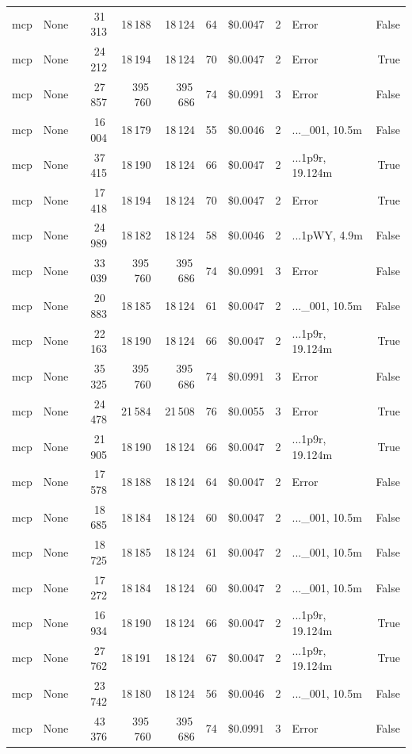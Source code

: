 \documentclass[a4paper,11pt]{article}
\begin{document}
\begin{table}[H]
{\begin{tabular}{l r r r r r r r l r}
mcp & None & 31\,313 & 18\,188 & 18\,124 & 64 & \$0.0047 & 2 & Error & False \\
mcp & None & 24\,212 & 18\,194 & 18\,124 & 70 & \$0.0047 & 2 & Error & True \\
mcp & None & 27\,857 & 395\,760 & 395\,686 & 74 & \$0.0991 & 3 & Error & False \\
mcp & None & 16\,004 & 18\,179 & 18\,124 & 55 & \$0.0046 & 2 & ...\_001, 10.5m & False \\
mcp & None & 37\,415 & 18\,190 & 18\,124 & 66 & \$0.0047 & 2 & ...1p9r, 19.124m & True \\
mcp & None & 17\,418 & 18\,194 & 18\,124 & 70 & \$0.0047 & 2 & Error & True \\
mcp & None & 24\,989 & 18\,182 & 18\,124 & 58 & \$0.0046 & 2 & ...1pWY, 4.9m & False \\
mcp & None & 33\,039 & 395\,760 & 395\,686 & 74 & \$0.0991 & 3 & Error & False \\
mcp & None & 20\,883 & 18\,185 & 18\,124 & 61 & \$0.0047 & 2 & ...\_001, 10.5m & False \\
mcp & None & 22\,163 & 18\,190 & 18\,124 & 66 & \$0.0047 & 2 & ...1p9r, 19.124m & True \\
mcp & None & 35\,325 & 395\,760 & 395\,686 & 74 & \$0.0991 & 3 & Error & False \\
mcp & None & 24\,478 & 21\,584 & 21\,508 & 76 & \$0.0055 & 3 & Error & True \\
mcp & None & 21\,905 & 18\,190 & 18\,124 & 66 & \$0.0047 & 2 & ...1p9r, 19.124m & True \\
mcp & None & 17\,578 & 18\,188 & 18\,124 & 64 & \$0.0047 & 2 & Error & False \\
mcp & None & 18\,685 & 18\,184 & 18\,124 & 60 & \$0.0047 & 2 & ...\_001, 10.5m & False \\
mcp & None & 18\,725 & 18\,185 & 18\,124 & 61 & \$0.0047 & 2 & ...\_001, 10.5m & False \\
mcp & None & 17\,272 & 18\,184 & 18\,124 & 60 & \$0.0047 & 2 & ...\_001, 10.5m & False \\
mcp & None & 16\,934 & 18\,190 & 18\,124 & 66 & \$0.0047 & 2 & ...1p9r, 19.124m & True \\
mcp & None & 27\,762 & 18\,191 & 18\,124 & 67 & \$0.0047 & 2 & ...1p9r, 19.124m & True \\
mcp & None & 23\,742 & 18\,180 & 18\,124 & 56 & \$0.0046 & 2 & ...\_001, 10.5m & False \\
mcp & None & 43\,376 & 395\,760 & 395\,686 & 74 & \$0.0991 & 3 & Error & False \\

\end{tabular}}
\end{table}
\end{document}
